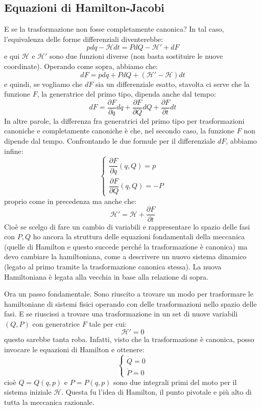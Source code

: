 \documentclass[a4paper,openany]{article}
\begin{document}
\subsection{Equazioni di Hamilton-Jacobi}
E se la trasformazione non fosse completamente canonica? In tal caso, l'equivalenza delle forme differenziali diventerebbe:
\begin{equation}\label{key}
	pdq-\mathcal{H}dt = PdQ-\mathcal{H}'+dF
\end{equation}
e qui $\mathcal{H} \mbox{ e } \mathcal{H}'$ sono due funzioni diverse (non basta sostituire le nuove coordinate). Operando come sopra, abbiamo che:
$$
dF = pdq + PdQ + (\mathcal{H}'-\mathcal{H})dt
$$
e quindi, se vogliamo che $dF$ sia un differenziale esatto, stavolta ci serve che la funzione $F$, la generatrice del primo tipo, dipenda anche dal tempo:
$$
dF = \dfrac{\partial F}{\partial q}dq+\dfrac{\partial F}{\partial Q}dQ + \dfrac{\partial F}{\partial t}dt
$$
In altre parole, la differenza fra generatrici del primo tipo per trasformazioni canoniche e completamente canoniche è che, nel secondo caso, la funzione $F$ non dipende dal tempo. Confrontando le due formule per il differenziale $dF$, abbiamo infine:
\begin{equation}
	\begin{cases}
		\dfrac{\partial F}{\partial q}(q,Q)=p \\[8pt]
		\dfrac{\partial F}{\partial Q}(q,Q) = -P
	\end{cases}
\end{equation}
proprio come in precedenza ma anche che:
\begin{equation}
\mathcal{H}' = \mathcal{H}  + \dfrac{\partial F}{\partial t}
\end{equation}
Cioè se scelgo di fare un cambio di variabili e rappresentare lo spazio delle fasi con $P,Q$ ho ancora la struttura delle equazioni fondamentali della meccanica (quelle di Hamilton e questo succede perché la trasformazione è canonica) ma devo cambiare la hamiltoniana, come a descrivere un nuovo sistema dinamico (legato al primo tramite la trasformazione canonica stessa). La nuova Hamiltoniana è legata alla vecchia in base alla relazione di sopra.

Ora un passo fondamentale. Sono riuscito a trovare un modo per trasformare le hamiltoniane di sistemi fisici operando con delle trasformazioni nello spazio delle fasi. E se riuscissi a trovare una trasformazione in un set di nuove variabili $(Q,P)$ con generatrice $F$ tale per cui:
\begin{equation}\label{key}
	\mathcal{H}' = 0
\end{equation}
questo sarebbe tanta roba. Infatti, visto che la trasformazione è canonica, posso invocare le equazioni di Hamilton e ottenere:
\begin{equation}\label{key}
	\begin{cases}
		\dot{Q} = 0 \\
		\dot{P} =0
	\end{cases}
\end{equation}
cioè $Q = Q(q,p)$ e $P=P(q,p)$ sono due integrali primi del moto per il sistema iniziale $\mathcal{H}$. Questa fu l'idea di Hamilton, il punto pivotale e più alto di tutta la meccanica razionale.
\end{document}
